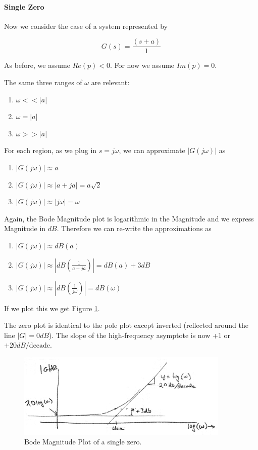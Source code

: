 \paragraph{Single Zero}
Now we consider the case of a system represented by

\[
G(s) = \frac{(s+a)}{1}
\]

As before, we assume $Re(p) < 0$.  For now we assume $Im(p) = 0$.

The same three ranges of $\omega$ are relevant:

\begin{enumerate}
  \item  $\omega << |a|$
  \item  $\omega = |a|$
  \item  $\omega >> |a|$
\end{enumerate}

For each region, as we plug in $s=j\omega$, we can approximate $|G(j\omega)|$ as

\begin{enumerate}
  \item  $|G(j\omega)| \approx a$
  \item  $|G(j\omega)| \approx \left | a+ja \right | = a\sqrt{2}$
  \item  $|G(j\omega)| \approx \left | j\omega \right | = \omega$
\end{enumerate}

Again, the Bode Magnitude plot is logarithmic in the Magnitude and we express Magnitude in $dB$.
Therefore we can re-write the  approximations  as

\begin{enumerate}
  \item  $|G(j\omega)| \approx dB(a)$
  \item  $|G(j\omega)| \approx \left | dB(\frac{1}{a+ja})    \right | = dB(a)+3dB$
  \item  $|G(j\omega)| \approx \left | dB(\frac{1}{j\omega}) \right | = dB(\omega)$
\end{enumerate}

If we plot this we get Figure \ref{BodeMagOneZero}.

The zero plot is identical to the pole plot except inverted (reflected around the line $|G| = 0dB$).
The slope of the high-frequency asymptote is now +1 or $+20dB/\mathrm{decade}$.


\begin{figure}\centering
\includegraphics[width=4.0in]{figs05/00735a.png}
\caption{Bode Magnitude Plot of a single zero.}\label{BodeMagOneZero}
\end{figure}


